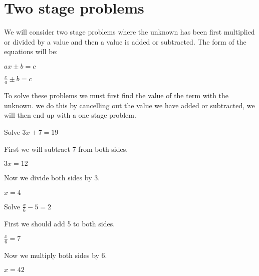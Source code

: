 \section{Two stage problems}
We will consider two stage problems where the unknown has been first multiplied or divided by a value and then a value is added or subtracted.  The form of the equations will be:

\begin{multicols}{2}
	$ax \pm b = c$
	
	$\displaystyle \frac{x}{a} \pm b = c$
\end{multicols}

\noindent To solve these problems we must first find the value of the term with the unknown.  we do this by cancelling out the value we have added or subtracted, we will then end up with a one stage problem.

\begin{exmp}

Solve $3x + 7 = 19$

First we will subtract 7 from both sides.

$3x = 12$

Now we divide both sides by 3.

$x = 4$
\end{exmp}

\begin{exmp}

\bigskip

Solve $\displaystyle \frac{x}{6} - 5 = 2$

\bigskip

First we should add 5 to both sides.

\bigskip

$\displaystyle \frac{x}{6} = 7$

\bigskip

Now we multiply both sides by 6.

$x = 42$
\end{exmp}

